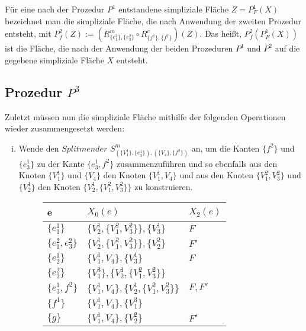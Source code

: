 \documentclass[12pt,titlepage,twoside,cleardoublepage]{article}
\theoremstyle{nummermitklammern}
\numberwithin{equation}{section}
\begin{document}
Für eine nach der Prozedur $P^1$ entstandene simpliziale Fläche $Z=P^1_F(X)$  bezeichnet man die simpliziale Fläche, die nach Anwendung der zweiten Prozedur entsteht, mit \emph{$P^2_f(Z)$}$:=(R^m_{\{e_1^2\},\{e_3^2\}}\circ R^c_{\{f^1\},\{f^2\}})(Z)$. Das heißt, $P^2_f(P^1_F(X))$ ist die Fläche, die nach der Anwendung der beiden Prozeduren $P^1$ und $P^2$ auf die gegebene simpliziale Fläche $X$ entsteht.

\subsection{Prozedur $P^3$}
 Zuletzt müssen nun die simpliziale Fläche mithilfe der folgenden Operationen wieder zusammengesetzt werden:
\begin{enumerate}[(i)]
\item Wende den $Splitmender$ $S^{m}_{(\{V^1_{1}\},\{e^1_{3}\}),(\{V_{4}\},\{f^2\})}$ an, um die Kanten $\{f^2\}$ und $\{e_3^1\}$ zu der Kante $\{e_3^1,f^2\}$ zusammenzuführen und so ebenfalls aus den Knoten $\{V_1^1\}$ und $\{V_4\}$ den Knoten $\{V_1^1,V_4\}$ und aus den Knoten $\{V_1^2,V_3^2\}$ und $\{V_2^1\}$ den Knoten $\{V_2^1,\{V_1^2,V_3^2\}\}$ zu konstruieren.
\begin{figure}[H]
\begin{center}
\begin{tabularx}{\textwidth}{XXX}
\hline
\textbf{e}&\textbf{$X_0(e)$}&\textbf{$X_2(e)$}\\
 \hline
 $\{e_1^1\}$ & $\{V_2^1,\{V_1^2,V_3^2\}\},\{V_3^1\}$& $F$\\
 \hline 
  $\{e_1^2,e_3^2\}$ & $\{V_2^1,\{V_1^2,V_3^2\}\},\{V_2^2\}$&$F'$\\ 
  \hline
  $\{e_2^1\}$&$\{V_1^1,V_4\},\{V_3^1\}$ & $F$\\
  \hline
   $\{e_2^2\}$&$\{V_1^3\},\{V_2^1,\{V_1^2,V_3^2\}\}$ & \\
  \hline
  $\{e_3^1,f^2\}$&$\{V_1^1,V_4\},\{V_2^1,\{V_1^2,V_3^2\}\}$ & $F,F'$\\ \hline  
   $\{f^1\}$&$\{V_1^1,V_4\},\{V_1^3\}$& \\
   \hline
   $\{g\}$ & $\{V_1^1,V_4\},\{V_2^2\}$ & $F'$ \\
   \hline
 \end{tabularx} %
\end{center}
\end{figure}
\begin{figure}[H]

\end{figure}
\end{enumerate}
\end{document}
